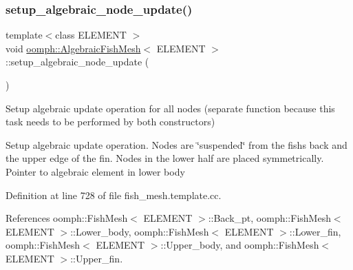 \mbox{\label{classoomph_1_1AlgebraicFishMesh_a1a6d22eedc77299d843274e8ce34b560}} 
\subsubsection{\texorpdfstring{setup\+\_\+algebraic\+\_\+node\+\_\+update()}{setup\_algebraic\_node\_update()}}
{\footnotesize\ttfamily template$<$class E\+L\+E\+M\+E\+NT $>$ \\
void \hyperlink{classoomph_1_1AlgebraicFishMesh}{oomph\+::\+Algebraic\+Fish\+Mesh}$<$ E\+L\+E\+M\+E\+NT $>$\+::setup\+\_\+algebraic\+\_\+node\+\_\+update (\begin{DoxyParamCaption}{ }\end{DoxyParamCaption})\hspace{0.3cm}{\ttfamily [protected]}}



Setup algebraic update operation for all nodes (separate function because this task needs to be performed by both constructors) 

Setup algebraic update operation. Nodes are \char`\"{}suspended\char`\"{} from the fish\textquotesingle{}s back and the upper edge of the fin. Nodes in the lower half are placed symmetrically. Pointer to algebraic element in lower body 

Definition at line 728 of file fish\+\_\+mesh.\+template.\+cc.



References oomph\+::\+Fish\+Mesh$<$ E\+L\+E\+M\+E\+N\+T $>$\+::\+Back\+\_\+pt, oomph\+::\+Fish\+Mesh$<$ E\+L\+E\+M\+E\+N\+T $>$\+::\+Lower\+\_\+body, oomph\+::\+Fish\+Mesh$<$ E\+L\+E\+M\+E\+N\+T $>$\+::\+Lower\+\_\+fin, oomph\+::\+Fish\+Mesh$<$ E\+L\+E\+M\+E\+N\+T $>$\+::\+Upper\+\_\+body, and oomph\+::\+Fish\+Mesh$<$ E\+L\+E\+M\+E\+N\+T $>$\+::\+Upper\+\_\+fin.

\mbox{\label{classoomph_1_1AlgebraicFishMesh_a4f992939c299f87abc762c14aab50b5c}} 

